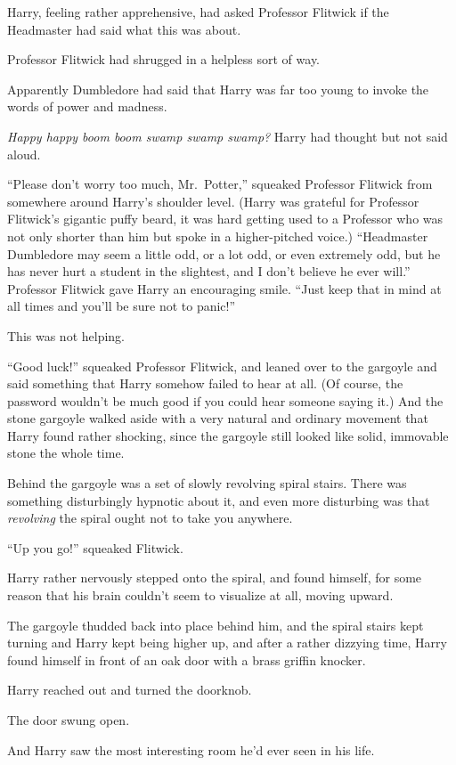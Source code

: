 Harry, feeling rather apprehensive, had asked Professor Flitwick if the Headmaster had said what this was about.

Professor Flitwick had shrugged in a helpless sort of way.

Apparently Dumbledore had said that Harry was far too young to invoke the words of power and madness.

\emph{Happy happy boom boom swamp swamp swamp?} Harry had thought but not said aloud.

“Please don’t worry too much, Mr.~Potter,” squeaked Professor Flitwick from somewhere around Harry’s shoulder level. (Harry was grateful for Professor Flitwick’s gigantic puffy beard, it was hard getting used to a Professor who was not only shorter than him but spoke in a higher-pitched voice.) “Headmaster Dumbledore may seem a little odd, or a lot odd, or even extremely odd, but he has never hurt a student in the slightest, and I don’t believe he ever will.” Professor Flitwick gave Harry an encouraging smile. “Just keep that in mind at all times and you’ll be sure not to panic!”

This was not helping.

“Good luck!” squeaked Professor Flitwick, and leaned over to the gargoyle and said something that Harry somehow failed to hear at all. (Of course, the password wouldn’t be much good if you could hear someone saying it.) And the stone gargoyle walked aside with a very natural and ordinary movement that Harry found rather shocking, since the gargoyle still looked like solid, immovable stone the whole time.

Behind the gargoyle was a set of slowly revolving spiral stairs. There was something disturbingly hypnotic about it, and even more disturbing was that \emph{revolving} the spiral ought not to take you anywhere.

“Up you go!” squeaked Flitwick.

Harry rather nervously stepped onto the spiral, and found himself, for some reason that his brain couldn’t seem to visualize at all, moving upward.

The gargoyle thudded back into place behind him, and the spiral stairs kept turning and Harry kept being higher up, and after a rather dizzying time, Harry found himself in front of an oak door with a brass griffin knocker.

Harry reached out and turned the doorknob.

The door swung open.

And Harry saw the most interesting room he’d ever seen in his life.

